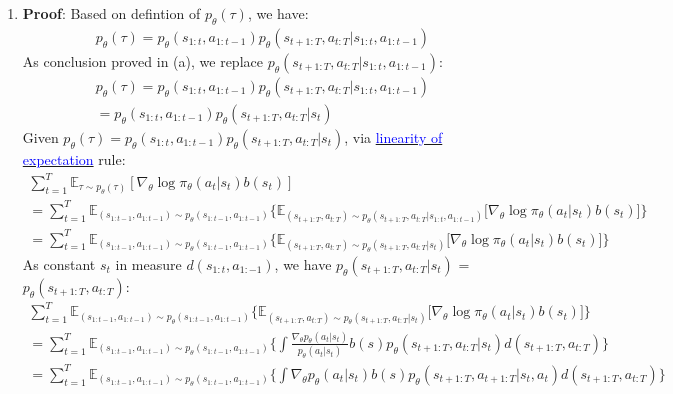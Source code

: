 \documentclass[12pt]{article}
\begin{document}
\begin{enumerate} [label=(\alph*)]
\begin{enumerate}[label=(\alph*)]
\item
\textbf{Proof}:
Based on defintion of $p_\theta(\tau)$, we have:
    \begin{align*}
    p_\theta(\tau) = p_\theta(s_{1:t}, a_{1:t-1}) p_\theta(s_{t+1:T}, a_{t:T} | s_{1:t}, a_{1:t-1})
	\end{align*}
As conclusion proved in (a), we replace $p_\theta(s_{t+1:T}, a_{t:T} | s_{1:t}, a_{1:t-1})$:
	\begin{multline}
	p_\theta(\tau) = p_\theta(s_{1:t}, a_{1:t-1}) p_\theta(s_{t+1:T}, a_{t:T} | s_{1:t}, a_{1:t-1}) \\
		= p_\theta(s_{1:t}, a_{1:t-1}) p_\theta(s_{t+1:T}, a_{t:T} | s_t)
	\end{multline}
Given $p_\theta(\tau) = p_\theta(s_{1:t}, a_{1:t-1}) p_\theta(s_{t+1:T}, a_{t:T} | s_t)$, via \href{https://brilliant.org/wiki/linearity-of-expectation/}{\textcolor{blue}{linearity of expectation}}  rule:
\begin{multline}
\sum_{t=1}^T \mathbb{E}_{\tau \sim p_\theta(\tau)}\left[ \nabla_\theta \log \pi_\theta(a_t|s_t) b(s_t)\right] \\
 =  \sum_{t=1}^T \mathbb{E}_{(s_{1:t-1},a_{1:t-1}) \sim p_\theta(s_{1:t-1},a_{1:t-1})} \lbrace \mathbb{E}_{(s_{t+1:T},a_{t:T}) \sim p_\theta(s_{t+1:T},a_{t:T}|s_{1:t}, a_{1:t-1})} \lbrack  \nabla_\theta \log \pi_\theta(a_t|s_t) b(s_t)\rbrack \rbrace \\
 =  \sum_{t=1}^T \mathbb{E}_{(s_{1:t-1},a_{1:t-1}) \sim p_\theta(s_{1:t-1},a_{1:t-1})} \lbrace \mathbb{E}_{(s_{t+1:T},a_{t:T}) \sim p_\theta(s_{t+1:T},a_{t:T}|s_t)} \lbrack  \nabla_\theta \log \pi_\theta(a_t|s_t) b(s_t)\rbrack \rbrace 
 \end{multline}
 As constant $s_t$ in measure $d(s_{1:t}, a_{1:-1})$, we have $p_\theta(s_{t+1:T}, a_{t:T} | s_t)$ = $p_\theta(s_{t+1:T}, a_{t:T} )$:
 \begin{multline}
 \sum_{t=1}^T \mathbb{E}_{(s_{1:t-1},a_{1:t-1}) \sim p_\theta(s_{1:t-1},a_{1:t-1})} \lbrace \mathbb{E}_{(s_{t+1:T},a_{t:T}) \sim p_\theta(s_{t+1:T},a_{t:T}|s_t)} \lbrack  \nabla_\theta \log \pi_\theta(a_t|s_t) b(s_t)\rbrack \rbrace \\
 = \sum_{t=1}^T \mathbb{E}_{(s_{1:t-1},a_{1:t-1}) \sim p_\theta(s_{1:t-1},a_{1:t-1})} \lbrace \int \frac{\nabla_\theta p_\theta(a_t|s_t)}{p_\theta(a_t|s_t)} b(s) p_\theta(s_{t+1:T}, a_{t:T} | s_t) d(s_{t+1:T}, a_{t:T})\rbrace \\
 =  \sum_{t=1}^T \mathbb{E}_{(s_{1:t-1},a_{1:t-1}) \sim p_\theta(s_{1:t-1},a_{1:t-1})} \lbrace \int \nabla_\theta p_\theta(a_t|s_t) b(s) p_\theta(s_{t+1:T}, a_{t+1:T} | s_t, a_t ) d(s_{t+1:T}, a_{t:T})\rbrace \\

\end{multline}
\end{enumerate}
\end{enumerate}
\end{document}
